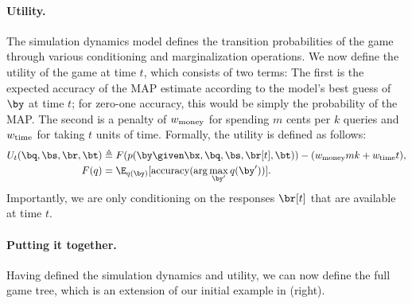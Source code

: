 \paragraph{Utility.}

The simulation dynamics model defines the transition probabilities of the game
through various conditioning and marginalization operations.
We now define the utility of the game at time $t$, which consists of two terms:
The first is the expected accuracy of the MAP estimate according to the model's best guess of $\by$ at time $t$;
for zero-one accuracy, this would be simply the probability of the MAP.
The second is a penalty of $w_\text{money}$ for spending $m$ cents per $k$ queries
and $w_\text{time}$ for taking $t$ units of time.
Formally, the utility is defined as follows:
\begin{align}
  U_t(\bq, \bs, \br, \bt) &\eqdef F(p(\by \given \bx, \bq, \bs, \br[t], \bt)) - (\weightmoney m k + \weighttime t), \\
  F(q) &= \E_{q(\by)}[\accuracy(\arg\max_{\by'} q(\by'))].
\end{align}
Importantly, we are only conditioning on the responses $\br[t]$ that are available at time $t$.

\paragraph{Putting it together.}

Having defined the simulation dynamics and utility, we can now define the full game tree,
which is an extension of our initial example in (right).


